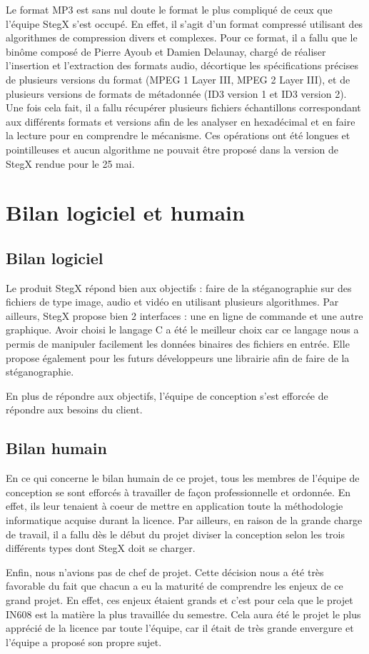\documentclass[11pt]{article}
\begin{document}
Le format MP3 est sans nul doute le format le plus compliqué de ceux que
l'équipe StegX s'est occupé. En effet, il s'agit d'un format compressé utilisant
des algorithmes de compression divers et complexes. Pour ce format, il a fallu
que le binôme composé de Pierre Ayoub et Damien Delaunay, chargé de réaliser
l'insertion et l'extraction des formats audio, décortique les spécifications
précises de plusieurs versions du format (MPEG 1 Layer III, MPEG 2 Layer III),
et de plusieurs versions de formats de métadonnée (ID3 version 1 et ID3 version
2). Une fois cela fait, il a fallu récupérer plusieurs fichiers échantillons
correspondant aux différents formats et versions afin de les analyser en
hexadécimal et en faire la lecture pour en comprendre le mécanisme. Ces
opérations ont été longues et pointilleuses et aucun algorithme ne pouvait être
proposé dans la version de StegX rendue pour le 25 mai. 

\section{Bilan logiciel et humain}

\subsection{Bilan logiciel}

Le produit StegX répond bien aux objectifs : faire de la stéganographie sur des
fichiers de type image, audio et vidéo en utilisant plusieurs algorithmes. Par
ailleurs, StegX propose bien 2 interfaces : une en ligne de commande et une
autre graphique. Avoir choisi le langage C a été le meilleur choix car ce
langage nous a permis de manipuler facilement les données binaires des fichiers
en entrée. Elle propose également pour les futurs développeurs une librairie 
afin de faire de la stéganographie. 

En plus de répondre aux objectifs, l'équipe de conception s'est efforcée 
de répondre aux besoins du client. 

\subsection{Bilan humain}

En ce qui concerne le bilan humain de ce projet, tous les membres de l'équipe 
de conception se sont efforcés à travailler de façon professionnelle et ordonnée. 
En effet, ils leur tenaient à coeur de mettre en application toute la méthodologie 
informatique acquise durant la licence. Par ailleurs, en raison de la grande 
charge de travail, il a fallu dès le début du projet diviser la conception 
selon les trois différents types dont StegX doit se charger.

Enfin, nous n'avions pas de chef de projet. Cette décision nous a été très
favorable du fait que chacun a eu la maturité de comprendre les enjeux de ce
grand projet. En effet, ces enjeux étaient grands et c'est pour cela que le
projet IN608 est la matière la plus travaillée du semestre. Cela aura été le
projet le plus apprécié de la licence par toute l'équipe, car il était de très
grande envergure et l'équipe a proposé son propre sujet. 
\end{document}
